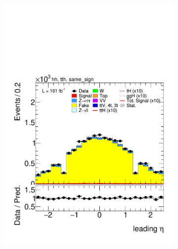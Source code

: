 \begin{figure}[htbp]
\begin{subfigure}[b]{0.45\textwidth}
    \includegraphics[width=\textwidth]{images/same_sign_same_sign_run3/plot_tau_0_eta_hh_tth_22_23_24_same_sign.pdf}
    \caption{}
  \end{subfigure}



\end{figure}
